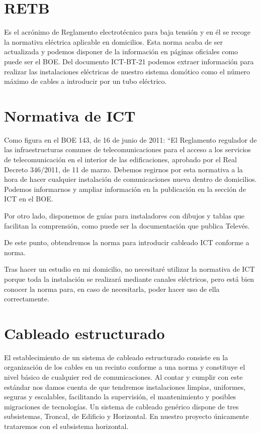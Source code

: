 \section{RETB}
Es el acrónimo de Reglamento electrotécnico para baja tensión y en él se recoge la normativa eléctrica aplicable en domicilios.
Esta norma acaba de ser actualizada y podemos disponer de la información en páginas oficiales como puede ser el BOE\cite{manual:REBT}.
Del documento ICT-BT-21\cite{manual:ICT-BT-21} podemos extraer información para realizar las instalaciones eléctricas de nuestro sistema domótico como el número máximo de cables a introducir por un tubo eléctrico.

\section{Normativa de ICT}
Como figura en el BOE 143, de 16 de junio de 2011: “El Reglamento regulador de las infraestructuras comunes de telecomunicaciones para el acceso a los servicios de telecomunicación en el interior de las edificaciones, aprobado por el Real Decreto 346/2011, de 11 de marzo.
Debemos regirnos por esta normativa a la hora de hacer cualquier instalación de comunicaciones nueva dentro de domicilios.
Podemos informarnos y ampliar información en la publicación en la sección de ICT en el BOE\cite{manual:ICT}.

Por otro lado, disponemos de guías para instaladores con dibujos y tablas que facilitan la comprensión, como puede ser la documentación que publica Televés\cite{manual:ICT-Televés}.

De este punto, obtendremos la norma para introducir cableado ICT\cite{manual:ICT} conforme a norma.

Tras hacer un estudio en mi domicilio, no necesitaré utilizar la normativa de ICT\cite{manual:ICT} porque toda la instalación se realizará mediante canales eléctricos, pero está bien conocer la norma para, en caso de necesitarla, poder hacer uso de ella correctamente.

\section{Cableado estructurado}
El establecimiento de un sistema de cableado estructurado consiste en la organización de los cables en un recinto conforme a una norma y constituye el nivel básico de cualquier red de comunicaciones.
Al contar y cumplir con este estándar nos damos cuenta de que tendremos instalaciones limpias, uniformes, seguras y escalables, facilitando la supervisión, el mantenimiento y posibles migraciones de tecnologías.
Un sistema de cableado genérico dispone de tres subsistemas, Troncal, de Edificio y Horizontal. En nuestro proyecto únicamente trataremos con el subsistema horizontal.

